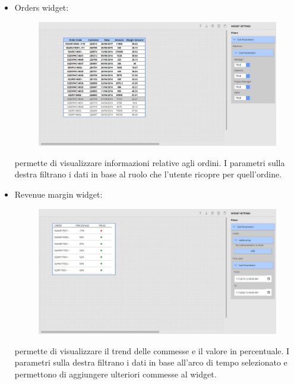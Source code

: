 \begin{itemize}
    \item Orders widget: 
    
\begin{figure}[ht]
\centering
\includegraphics[scale=0.32]{images/Orders.JPG}
\end{figure}
permette di visualizzare informazioni relative agli ordini. I parametri sulla destra filtrano i dati in base al ruolo che l'utente ricopre per quell'ordine.
\end{itemize}
\pagebreak
\begin{itemize}
    \item Revenue margin widget: 
    
\begin{figure}[ht]
\centering
\includegraphics[scale=0.32]{images/RevenueMargin.JPG}
\end{figure}
permette di visualizzare il trend delle commesse e il valore in percentuale. I parametri sulla destra filtrano i dati in base all'arco di tempo selezionato e permettono di aggiungere ulteriori commesse al widget.
\end{itemize}
